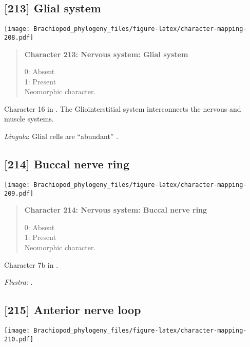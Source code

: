 \documentclass[openany]{book}
\theoremstyle{definition}
\theoremstyle{definition}
\theoremstyle{definition}
\theoremstyle{remark}
\begin{document}
\subsection*{{[}213{]} Glial system}\label{glial-system}

\texttt{[image: Brachiopod\_phylogeny\_files/figure-latex/character-mapping-208.pdf]}

\begin{quote}
\textbf{Character 213: Nervous system: Glial system}

0: Absent\\
1: Present\\
Neomorphic character.
\end{quote}

Character 16 in \citet{Haszprunar1996}. The Gliointerstitial system
interconnects the nervous and muscle systems.

\hypertarget{Lingula-coding-213}{}
\emph{Lingula}: Glial cells are ``abundant''
\citep{Temereva2016Phoronida}.

\subsection*{{[}214{]} Buccal nerve ring}\label{buccal-nerve-ring}

\texttt{[image: Brachiopod\_phylogeny\_files/figure-latex/character-mapping-209.pdf]}

\begin{quote}
\textbf{Character 214: Nervous system: Buccal nerve ring}

0: Absent\\
1: Present\\
Neomorphic character.
\end{quote}

Character 7b in \citet{Haszprunar2008}.

\hypertarget{Flustra-coding-214}{}
\emph{Flustra}: \citet{Temereva2016Thenervous}.

\subsection*{{[}215{]} Anterior nerve loop}\label{anterior-nerve-loop}

\texttt{[image: Brachiopod\_phylogeny\_files/figure-latex/character-mapping-210.pdf]}
\end{document}
